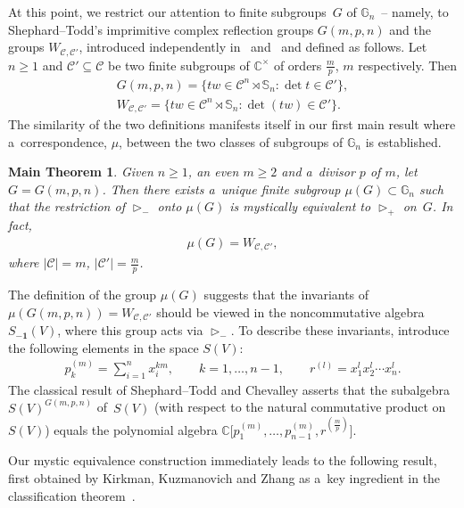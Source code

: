\documentclass[pdftex]{sigma}
\newtheorem{maintheorem}[Theorem]{Main Theorem}
\begin{document}
At this point, we restrict our attention to f\/inite subgroups~$G$ of $\mathbb G_n$~-- namely, to Shephard--Todd's
imprimitive complex ref\/lection groups $G(m,p,n)$ and the groups $W_{{\mathcal C},{\mathcal C}'}$, introduced
independently in~\cite{BBselecta} and~\cite{KKZ} and def\/ined as follows.
Let $n\ge 1$ and ${\mathcal C}'\subseteq{\mathcal C}$ be two f\/inite subgroups of $\mathbb C^\times$ of orders $\frac
mp$, $m$ respectively.
Then
\begin{gather*}
G(m,p,n)=\{tw\in {\mathcal C}^n\rtimes \mathbb S_n: \det t\in{\mathcal C}'\},
\\
W_{{\mathcal C},{\mathcal C}'} = \{ tw\in {\mathcal C}^n\rtimes \mathbb S_n: \det(tw)\in {\mathcal C}'\}.
\end{gather*}
The similarity of the two def\/initions manifests itself in our f\/irst main result  where a~correspondence, $\mu$,
between the two classes of subgroups of $\mathbb G_n$ is established.

\begin{maintheorem}
\label{thm:main}
Given $n\ge 1$, an even $m\ge 2$ and a~divisor $p$ of $m$, let $G=G(m,p,n)$.
Then there exists a~unique finite subgroup $ \mu(G) \subset \mathbb G_n $ such that the restriction of
$\mathop{\triangleright}\nolimits_-$ onto $\mu(G)$ is mystically equivalent to $\mathop{\triangleright}\nolimits_+$ on~$G$.
In fact,
\begin{gather*}
\mu(G)=W_{\mathcal C,\mathcal C'},
\end{gather*}
where $|{\mathcal C}|=m$, $|{\mathcal C}'|=\frac mp$.
\end{maintheorem}

The def\/inition of the group $\mu(G)$ suggests that the invariants of $\mu(G(m,p,n))=W_{{\mathcal C},{\mathcal C}'}$
should be viewed in the noncommutative algebra $S_{\mathbf{-1}}(V)$, where this group acts via
$\mathop{\triangleright}\nolimits_-$.
To describe these invariants, introduce the following elements in the space $S(V)$:
\begin{gather*}
p_k^{(m)} = \sum\limits_{i=1}^n x_i^{km},
\qquad
k=1,\ldots,n-1,
\qquad
r^{(l)} = x_1^{l}x_2^{l}\cdots x_n^{l}.
\end{gather*}
The classical result of Shephard--Todd and Chevalley asserts that the subalgebra $S(V)^{G(m,p,n)}$ of~$S(V)$ (with
respect to the natural commutative product on~$S(V)$) equals
the polynomial algebra $\mathbb C\big[p_1^{(m)},\ldots,p_{n-1}^{(m)}, r^{(\frac{m}{p})}\big]$.

Our mystic equivalence construction immediately leads to the following result, f\/irst obtained by Kirkman, Kuzmanovich
and Zhang as a~key ingredient in the classif\/ication theorem~\cite[Theorem~1.1]{KKZ}.
\end{document}
